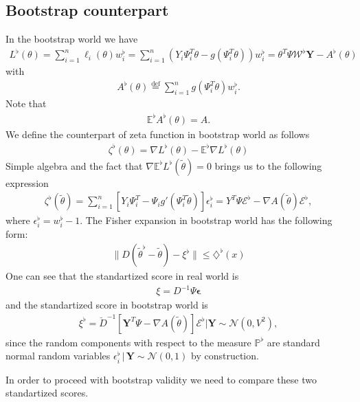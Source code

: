 \documentclass[12pt]{article}
\renewcommand{\=}[1]{\stackrel{#1}{=}} %
\providecommand{\e}{\epsilon}
\begin{document}
\subsection{Bootstrap counterpart}
In the bootstrap world we have 
\begin{align}
L^{\flat}(\theta) = \sum_{i=1}^n \ell_i(\theta) w_i^{\flat} = \sum_{i=1}^n \left(Y_i \Psi_i^T \theta - g(\Psi_i^T \theta)\right) w_i^{\flat} = \theta^T \Psi \mathcal{W}^{\flat}\mathbf{Y} - A^{\flat}(\theta)
\end{align}
with 
\begin{align}
A^{\flat}(\theta) \stackrel{\text{def}}{=} \sum_{i=1}^n g(\Psi_i^T \theta) w_i^{\flat}.
\end{align}
Note that 
\begin{align}
\mathbb{E}^{\flat} A^{\flat} (\theta) = A.
\end{align}
We define the counterpart of zeta function in bootstrap world as follows 
\begin{align}
\zeta^{\flat}(\theta) = \nabla L^{\flat}(\theta) - \mathbb{E}^{\flat} \nabla L^{\flat}(\theta)
\end{align}
Simple algebra and the fact that $\nabla \mathbb{E}^{\flat}L^{\flat}(\tilde{\theta}) = 0$ brings us to the following expression 
\begin{align}
\zeta^{\flat}(\tilde{\theta}) = \sum_{i=1}^n \left[Y_i \Psi_i^T - \Psi_i g'(\Psi_i^T \tilde{\theta})\right] \e_i^{\flat} = Y^T \Psi \mathcal{E}^{\flat} - \nabla A(\tilde{\theta}) \mathcal{E}^{\flat},
\end{align}
where $\e_i^{\flat} = w_i^{\flat} - 1$.
The Fisher expansion in bootstrap world has the following form: 
\begin{align}
\| D(\tilde{\theta}^{\flat} - \tilde{\theta}) - \xi^{\flat} \| \le \diamondsuit^{\flat}(x) 
\end{align}
One can see that the standartized score in real world is 
\begin{align}
\xi = D^{-1} \Psi \mathbf{\e} 
\end{align}
and the standartized score in bootstrap world is 
\begin{align}
\xi^{\flat} = \breve{D}^{-1} \left[\mathbf{Y}^T \Psi - \nabla A(\tilde{\theta})\right] \mathcal{E}^{\flat} | \mathbf{Y} \sim \mathcal{N}(0, V^2),
\end{align}
since the random components with respect to the measure $\mathbb{P}^{\flat}$ are standard normal random variables $\e_i^{\flat} \, | \, \mathbf{Y} \sim \mathcal{N}(0, 1)$ by construction.
\par In order to proceed with bootstrap validity we need to compare these two standartized scores. 
\end{document}
